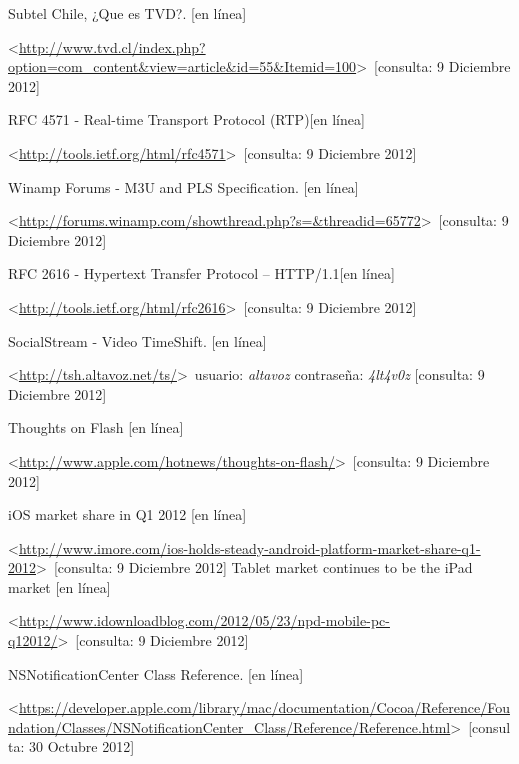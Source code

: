 
\begin{thebibliography}{99}
\begin{sloppypar}



%
Subtel Chile, ¿Que es TVD?. [en línea]\

\textless \url{http://www.tvd.cl/index.php?option=com_content&view=article&id=55&Itemid=100}\textgreater \ [consulta: 9 Diciembre 2012]

%
RFC 4571 - Real-time Transport Protocol (RTP)[en línea]\

\textless \url{http://tools.ietf.org/html/rfc4571}\textgreater \ [consulta: 9 Diciembre 2012]

%
Winamp Forums - M3U and PLS Specification. [en línea]\

\textless \url{http://forums.winamp.com/showthread.php?s=&threadid=65772}\textgreater \ [consulta: 9 Diciembre 2012]

%
RFC 2616 - Hypertext Transfer Protocol -- HTTP/1.1[en línea]\

\textless \url{http://tools.ietf.org/html/rfc2616}\textgreater \ [consulta: 9 Diciembre 2012]

%
SocialStream - Video TimeShift. [en línea]\

\textless \url{http://tsh.altavoz.net/ts/}\textgreater \ usuario: \textit{altavoz} contraseña: \textit{4lt4v0z} [consulta: 9 Diciembre 2012]

%
Thoughts on Flash [en línea]\

\textless \url{http://www.apple.com/hotnews/thoughts-on-flash/}\textgreater \ [consulta: 9 Diciembre 2012]

%
iOS market share in Q1 2012 [en línea] \

\textless \url{http://www.imore.com/ios-holds-steady-android-platform-market-share-q1-2012}\textgreater \ [consulta: 9 Diciembre 2012]
%
Tablet market continues to be the iPad market [en línea] \

\textless \url{http://www.idownloadblog.com/2012/05/23/npd-mobile-pc-q12012/}\textgreater \ [consulta: 9 Diciembre 2012]

%
NSNotificationCenter Class Reference. [en línea]\

\textless \url{https://developer.apple.com/library/mac/documentation/Cocoa/Reference/Foundation/Classes/NSNotificationCenter_Class/Reference/Reference.html}\textgreater \ [consulta: 30 Octubre 2012]


\end{sloppypar}
\end{thebibliography}

